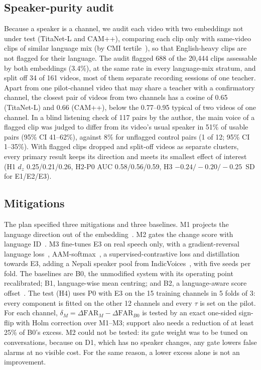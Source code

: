 \documentclass[conference]{IEEEtran}
\begin{document}
\subsection{Speaker-purity audit}
\label{sec:purity}
Because a speaker is a channel, we audit each video with two embeddings not under test
(TitaNet-L and CAM++), comparing each clip only with same-video clips of similar language
mix (by CMI tertile~\cite{gamback2016cmi}), so that English-heavy clips are not flagged for
their language. The audit flagged 688 of the 20{,}444 clips assessable by both embeddings (3.4\%), at the same rate in every
language-mix stratum, and split off 34 of 161 videos, most of them separate recording
sessions of one teacher. Apart from one pilot-channel video that may share a teacher with a
confirmatory channel, the closest pair of videos from two channels has a cosine of 0.65 (TitaNet-L) and 0.66 (CAM++),
below the 0.77--0.95 typical of two videos of one channel. In a blind listening check of 117
pairs by the author, the main voice of a flagged clip was judged to differ from its video's
usual speaker in 51\% of usable pairs (95\% CI 41--62\%), against 8\% for unflagged control pairs (1 of 12; 95\% CI 1--35\%). With flagged clips dropped and split-off videos as separate clusters, every primary
result keeps its direction and meets its smallest effect of interest (H1 $d_z$
0.25/0.21/0.26, H2-P0 AUC 0.58/0.56/0.59, H3 $-0.24/-0.20/-0.25$~SD for E1/E2/E3).

\subsection{Mitigations}
\label{sec:mit-method}
The plan specified three mitigations and three baselines. M1 projects the language direction
out of the embedding~\cite{hosseini2026}. M2 gates the change score with language
ID~\cite{valk2021voxlingua}. M3 fine-tunes E3 on real speech only, with a gradient-reversal
language loss~\cite{ganin2015grl}, AAM-softmax~\cite{deng2019arcface}, a
supervised-contrastive loss and distillation towards E3, adding a Nepali speaker pool from
IndicVoices~\cite{javed2024indicvoices}, with five seeds per fold. The baselines are B0, the
unmodified system with its operating point recalibrated; B1, language-wise mean centring;
and B2, a language-aware score offset~\cite{thienpondt2022}. The test (H4) uses P0 with E3
on the 15 training channels in 5 folds of 3: every component is fitted on the other 12
channels and every $\tau$ is set on the pilot. For each channel, $\delta_M =
\Delta\mathrm{FAR}_M - \Delta\mathrm{FAR}_{B0}$ is tested by an exact one-sided sign-flip
with Holm correction over M1--M3; support also needs a reduction of at least 25\% of B0's
excess. M2 could not be tested: its gate weight was to be tuned on conversations, because on
D1, which has no speaker changes, any gate lowers false alarms at no visible cost. For the
same reason, a lower excess alone is not an improvement.
\end{document}
